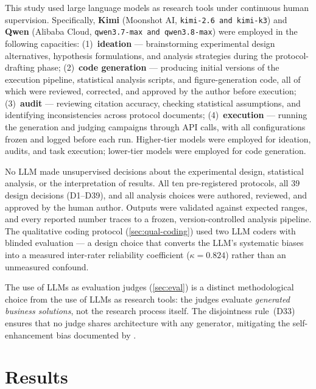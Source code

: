 \documentclass[12pt,a4paper]{article}
\begin{document}
This study used large language models as research tools under continuous human
supervision. Specifically, \textbf{Kimi} (Moonshot AI, \texttt{kimi-2.6 and kimi-k3}) and
\textbf{Qwen} (Alibaba Cloud, \texttt{qwen3.7-max and qwen3.8-max}) were employed in the
following capacities: (1)~\textbf{ideation} --- brainstorming experimental
design alternatives, hypothesis formulations, and analysis strategies during the
protocol-drafting phase; (2)~\textbf{code generation} --- producing initial
versions of the execution pipeline, statistical analysis scripts, and
figure-generation code, all of which were reviewed, corrected, and approved by
the author before execution; (3)~\textbf{audit} --- reviewing citation accuracy,
checking statistical assumptions, and identifying inconsistencies across
protocol documents; (4)~\textbf{execution} --- running the generation and
judging campaigns through API calls, with all configurations frozen and logged
before each run. Higher-tier models were employed for ideation, audits, and
task execution; lower-tier models were employed for code generation.

No LLM made unsupervised decisions about the experimental design, statistical
analysis, or the interpretation of results. All ten pre-registered protocols,
all 39 design decisions (D1--D39), and all analysis choices were authored,
reviewed, and approved by the human author. Outputs were
validated against expected ranges, and every reported number traces to a frozen,
version-controlled analysis pipeline. The qualitative coding protocol
(\cref{sec:qual-coding}) used two LLM coders with blinded evaluation --- a
design choice that converts the LLM's systematic biases into a measured
inter-rater reliability coefficient ($\kappa = 0.824$) rather than an unmeasured
confound.

The use of LLMs as evaluation judges (\cref{sec:eval}) is a distinct
methodological choice from the use of LLMs as research tools: the judges
evaluate \emph{generated business solutions}, not the research process itself.
The disjointness rule~(D33) ensures that no judge shares architecture with any
generator, mitigating the self-enhancement bias documented by
\citet{ZhengEtAl2023}.

\section{Results}\label{sec:results}
\end{document}
